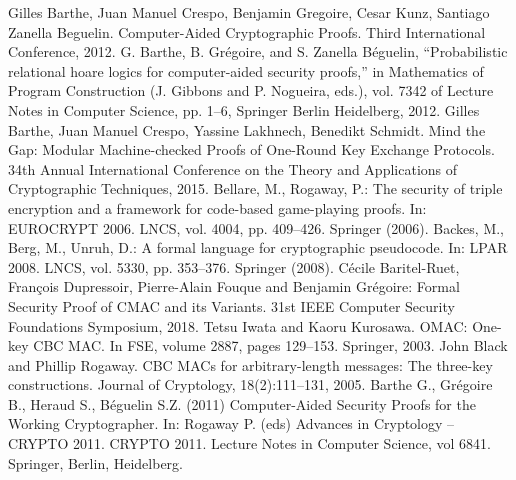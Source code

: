 \documentclass[runningheads]{llncs}
\begin{document}
\begin{thebibliography}{8}
Gilles Barthe, Juan Manuel Crespo, Benjamin Gregoire, Cesar Kunz, Santiago Zanella Beguelin. Computer-Aided Cryptographic Proofs. Third International Conference, 2012.
G. Barthe, B. Grégoire, and S. Zanella Béguelin, “Probabilistic relational hoare
logics for computer-aided security proofs,” in Mathematics of Program Construction
(J. Gibbons and P. Nogueira, eds.), vol. 7342 of Lecture Notes in
Computer Science, pp. 1–6, Springer Berlin Heidelberg, 2012.
Gilles Barthe, Juan Manuel Crespo, Yassine Lakhnech, Benedikt Schmidt. Mind the Gap: Modular Machine-checked Proofs of One-Round Key Exchange Protocols. 34th Annual International Conference on the Theory and Applications of Cryptographic Techniques, 2015.
Bellare, M., Rogaway, P.: The security of triple encryption and a framework for
code-based game-playing proofs. In: EUROCRYPT 2006. LNCS, vol. 4004, pp.
409–426. Springer (2006).
Backes, M., Berg, M., Unruh, D.: A formal language for cryptographic pseudocode.
In: LPAR 2008. LNCS, vol. 5330, pp. 353–376. Springer (2008).
Cécile Baritel-Ruet, François Dupressoir, Pierre-Alain Fouque and Benjamin Grégoire: Formal Security Proof of CMAC and its Variants.
31st IEEE Computer Security Foundations Symposium, 2018.
Tetsu Iwata and Kaoru Kurosawa. OMAC: One-key CBC MAC. In FSE, volume 2887, pages 129–153. Springer, 2003.
John Black and Phillip Rogaway. CBC MACs for arbitrary-length messages: The three-key constructions. Journal of Cryptology, 18(2):111–131, 2005.
Barthe G., Grégoire B., Heraud S., Béguelin S.Z. (2011) Computer-Aided Security Proofs for the Working Cryptographer. In: Rogaway P. (eds) Advances in Cryptology – CRYPTO 2011. CRYPTO 2011. Lecture Notes in Computer Science, vol 6841. Springer, Berlin, Heidelberg.

\end{thebibliography}
\end{document}
